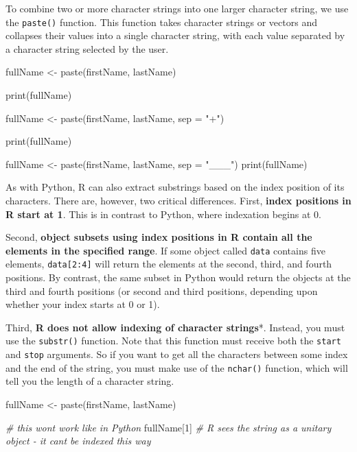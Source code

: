 \documentclass[
]{book}
\newenvironment{Shaded}{\begin{snugshade}}{\end{snugshade}}
\newcommand{\AttributeTok}[1]{\textcolor[rgb]{0.77,0.63,0.00}{#1}}
\newcommand{\CommentTok}[1]{\textcolor[rgb]{0.56,0.35,0.01}{\textit{#1}}}
\newcommand{\DecValTok}[1]{\textcolor[rgb]{0.00,0.00,0.81}{#1}}
\newcommand{\FunctionTok}[1]{\textcolor[rgb]{0.00,0.00,0.00}{#1}}
\newcommand{\NormalTok}[1]{#1}
\newcommand{\OtherTok}[1]{\textcolor[rgb]{0.56,0.35,0.01}{#1}}
\newcommand{\StringTok}[1]{\textcolor[rgb]{0.31,0.60,0.02}{#1}}
\begin{document}
To combine two or more character strings into one larger character string, we use the \texttt{paste()} function. This function takes character strings or vectors and collapses their values into a single character string, with each value separated by a character string selected by the user.

\begin{Shaded}
\begin{Highlighting}[]
\NormalTok{fullName }\OtherTok{\textless{}{-}} \FunctionTok{paste}\NormalTok{(firstName, lastName)}

\FunctionTok{print}\NormalTok{(fullName)}

\NormalTok{fullName }\OtherTok{\textless{}{-}} \FunctionTok{paste}\NormalTok{(firstName, lastName, }\AttributeTok{sep =} \StringTok{"+"}\NormalTok{)}

\FunctionTok{print}\NormalTok{(fullName)}

\NormalTok{fullName }\OtherTok{\textless{}{-}} \FunctionTok{paste}\NormalTok{(firstName, lastName, }\AttributeTok{sep =} \StringTok{"\_\_\_"}\NormalTok{)}
\FunctionTok{print}\NormalTok{(fullName)}
\end{Highlighting}
\end{Shaded}

As with Python, R can also extract substrings based on the index position of its characters. There are, however, two critical differences. First, \textbf{index positions in R start at 1}. This is in contrast to Python, where indexation begins at 0.

Second, \textbf{object subsets using index positions in R contain all the elements in the specified range}. If some object called \texttt{data} contains five elements, \texttt{data{[}2:4{]}} will return the elements at the second, third, and fourth positions. By contrast, the same subset in Python would return the objects at the third and fourth positions (or second and third positions, depending upon whether your index starts at 0 or 1).

Third, \textbf{R does not allow indexing of character strings}*. Instead, you must use the \texttt{substr()} function. Note that this function must receive both the \texttt{start} and \texttt{stop} arguments. So if you want to get all the characters between some index and the end of the string, you must make use of the \texttt{nchar()} function, which will tell you the length of a character string.

\begin{Shaded}
\begin{Highlighting}[]
\NormalTok{fullName }\OtherTok{\textless{}{-}} \FunctionTok{paste}\NormalTok{(firstName, lastName)}

\CommentTok{\# this won\textquotesingle{}t work like in Python}
\NormalTok{fullName[}\DecValTok{1}\NormalTok{] }\CommentTok{\# R sees the string as a unitary object {-} it can\textquotesingle{}t be indexed this way}
\end{Highlighting}
\end{Shaded}
\end{document}
